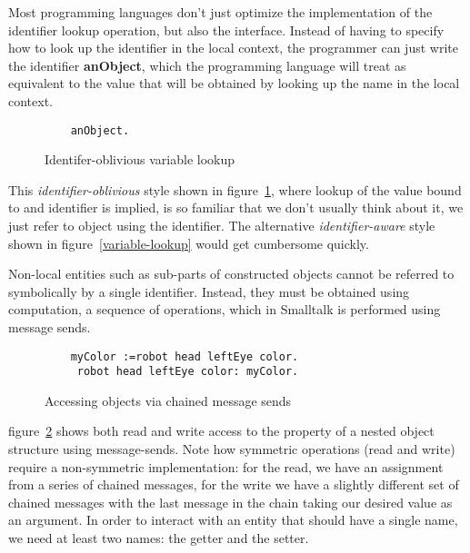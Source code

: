\documentclass[preprint,authoryear]{acm_proc_article-sp}
\begin{document}
Most programming languages don't just optimize the implementation of the identifier
lookup operation, but also the interface.  Instead of having to specify how to
look up the identifier in the local context, the programmer can just write the
identifier {\bf anObject}, which the programming language will treat as equivalent to the
value that will be obtained by looking up the name in the local context.  


\begin{figure}[htbp]
\begin{center}
\begin{small}
\begin{verbatim}
	anObject.
\end{verbatim}
\end{small}
\caption{Identifer-oblivious variable lookup}
\label{plain-identifier}
\end{center}
\end{figure}

This  {\em identifier-oblivious} style shown in figure~\ref{plain-identifier}, where lookup of the value bound to and
identifier is implied, is so familiar that we don't usually think about it, we just
refer to object using the identifier.
  The 
alternative {\em identifier-aware} style shown in figure~\ref{variable-lookup} would get cumbersome quickly.

Non-local entities such as sub-parts of constructed objects 
cannot be referred to symbolically by a single identifier.
Instead, they must be obtained using computation, a 
sequence of operations, which in Smalltalk is performed using message sends.

\begin{figure}[htbp]
\begin{center}
\begin{small}
\begin{verbatim}
	myColor :=robot head leftEye color.
	 robot head leftEye color: myColor.
\end{verbatim}
\end{small}
\caption{Accessing objects via chained message sends}
\label{non-local-reference}
\end{center}
\end{figure}

figure~\ref{non-local-reference} shows both read and write access to the property
of a nested object structure using message-sends.  Note how symmetric operations
(read and write) require a non-symmetric implementation:  for the read, we have an assignment
from a series of chained messages, for the write we have a slightly different set of 
chained messages with the last message in the chain taking our desired value
as an argument.  In order to interact with an entity that should have a single name,
we need at least two names:  the getter and the setter.
\end{document}
